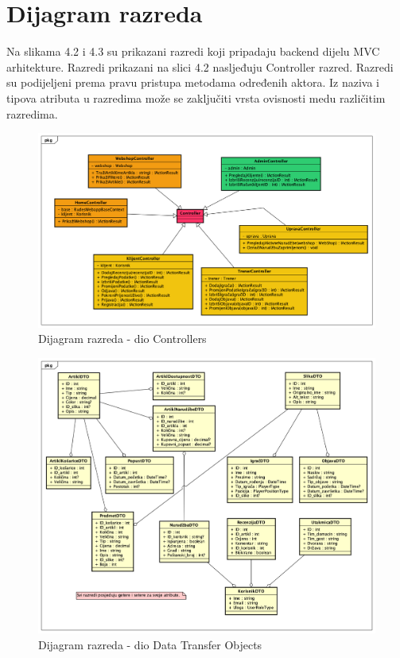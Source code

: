 			\eject
			
			
		\section{Dijagram razreda}
		
			\textnormal{Na slikama 4.2 i 4.3 su prikazani razredi koji pripadaju backend dijelu MVC arhitekture. Razredi prikazani na slici 4.2 nasljeđuju Controller razred. Razredi su podijeljeni prema pravu pristupa metodama određenih aktora. Iz naziva i tipova atributa u razredima može se zaključiti vrsta ovisnosti medu različitim razredima.}\\
			
			\begin{figure}[H]
				\includegraphics[width=\linewidth]{dijagrami/DijagramRazredaController.png}
				\centering
				\caption{Dijagram razreda - dio Controllers}
				\label{fig:ClassDiagram1}
			\end{figure}
		
		\begin{figure}[H]
			\includegraphics[width=\linewidth]{dijagrami/Dijagram_DTO.png}
			\centering
			\caption{Dijagram razreda - dio Data Transfer Objects}
			\label{fig:ClassDiagram1}
		\end{figure}
		
